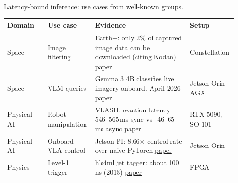 \documentclass[11pt,aspectratio=43]{beamer}
\begin{document}
\begin{frame}{Latency-bound inference: use cases from well-known groups.}

\begin{center}
\footnotesize
\raggedright
\renewcommand{\arraystretch}{1.2}
\setlength{\aboverulesep}{0pt}
\setlength{\belowrulesep}{0pt}
\begin{tabular}{>{\raggedright\arraybackslash}p{0.17\linewidth}|>{\raggedright\arraybackslash}p{0.19\linewidth}|>{\raggedright\arraybackslash}p{0.40\linewidth}|>{\raggedright\arraybackslash}p{0.18\linewidth}}
\toprule
\textbf{Domain} & \textbf{Use case} & \textbf{Evidence} & \textbf{Setup} \\
\midrule
Space & Image filtering & Earth+: only 2\% of captured image data can be downloaded (citing Kodan) \href{https://arxiv.org/abs/2403.11434}{\underline{paper}} & Constellation \\
Space & VLM queries & Gemma 3 4B classifies live imagery onboard, April 2026 \href{https://arxiv.org/abs/2606.18271}{\underline{paper}} & Jetson Orin AGX \\
Physical AI & Robot manipulation & VLASH: reaction latency 546--565\,ms sync vs.\ 46--65\,ms async \href{https://arxiv.org/abs/2512.01031}{\underline{paper}} & RTX 5090, SO-101 \\
Physical AI & Onboard VLA control & Jetson-PI: 8.66$\times$ control rate over naive PyTorch \href{https://arxiv.org/abs/2607.12659}{\underline{paper}} & Jetson Orin \\
Physics & Level-1 trigger & hls4ml jet tagger: about 100\,ns (2018) \href{https://arxiv.org/abs/1804.06913}{\underline{paper}} & FPGA \\
\bottomrule
\end{tabular}
\end{center}

\end{frame}
\end{document}
